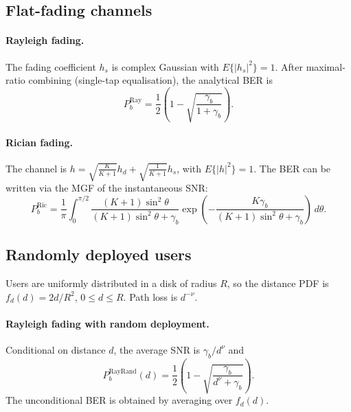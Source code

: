 \documentclass[12pt,a4paper]{article}
\begin{document}
\subsection{Flat-fading channels}
\paragraph{Rayleigh fading.} The fading coefficient $h_s$ is complex Gaussian with $E\{|h_s|^2\}=1$. After maximal-ratio combining (single-tap equalisation), the analytical BER is
\begin{equation}
    P_b^{\text{Ray}} = \frac{1}{2}\left(1 - \sqrt{\frac{\gamma_b}{1+\gamma_b}}\right).
\end{equation}

\paragraph{Rician fading.} The channel is $h = \sqrt{\frac{K}{K+1}}h_d + \sqrt{\frac{1}{K+1}}h_s$, with $E\{|h|^2\}=1$. The BER can be written via the MGF of the instantaneous SNR:
\begin{equation}
    P_b^{\text{Ric}} =
    \frac{1}{\pi}\int_{0}^{\pi/2}
    \frac{(K+1)\sin^2\theta}{(K+1)\sin^2\theta + \gamma_b}
    \exp\!\left(-\frac{K\gamma_b}{(K+1)\sin^2\theta + \gamma_b}\right)
    \,d\theta.
\end{equation}

\subsection{Randomly deployed users}
Users are uniformly distributed in a disk of radius $R$, so the distance PDF is $f_d(d)=2d/R^2$, $0\le d\le R$. Path loss is $d^{-\nu}$.

\paragraph{Rayleigh fading with random deployment.} Conditional on distance $d$, the average SNR is $\gamma_b/d^\nu$ and
\begin{equation}
    P_b^{\text{RayRand}}(d) =
    \frac{1}{2}\left(1 - \sqrt{\frac{\gamma_b}{d^\nu + \gamma_b}}\right).
\end{equation}
The unconditional BER is obtained by averaging over $f_d(d)$.
\end{document}
